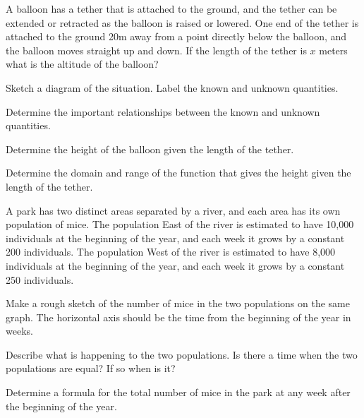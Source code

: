 \begin{problem}
\item A balloon has a tether that is attached to the ground, and the
  tether can be extended or retracted as the balloon is raised or
  lowered. One end of the tether is attached to the ground 20m away
  from a point directly below the balloon, and the balloon moves
  straight up and down. If the length of the tether is $x$ meters what
  is the altitude of the balloon?
  \begin{subproblem}
    \item Sketch a diagram of the situation. Label the known and
      unknown quantities.
      \vfill
      \vfill
    \item Determine the important relationships between the known and
      unknown quantities.
      \vfill
    \item Determine the height of the balloon given the length of the
      tether.
      \vfill
    \item Determine the domain and range of the function that gives
      the height given the length of the tether.
      \vfill
  \end{subproblem}

  \clearpage

\item A park has two distinct areas separated by a river, and each
  area has its own population of mice.  The population East of the
  river is estimated to have 10,000 individuals at the beginning of
  the year, and each week it grows by a constant 200 individuals. The
  population West of the river is estimated to have 8,000 individuals
  at the beginning of the year, and each week it grows by a constant
  250 individuals.

  \begin{subproblem}
  \item Make a rough sketch of the number of mice in the two
    populations on the same graph. The horizontal axis should be the
    time from the beginning of the year in weeks.
    \vfill

  \item Describe what is happening to the two populations. Is there a
    time when the two populations are equal? If so when is it?
    \vfill

  \item Determine a formula for the total number of mice in the park
    at any week after the beginning of the year.
    \vfill
  \end{subproblem}


\end{problem}
